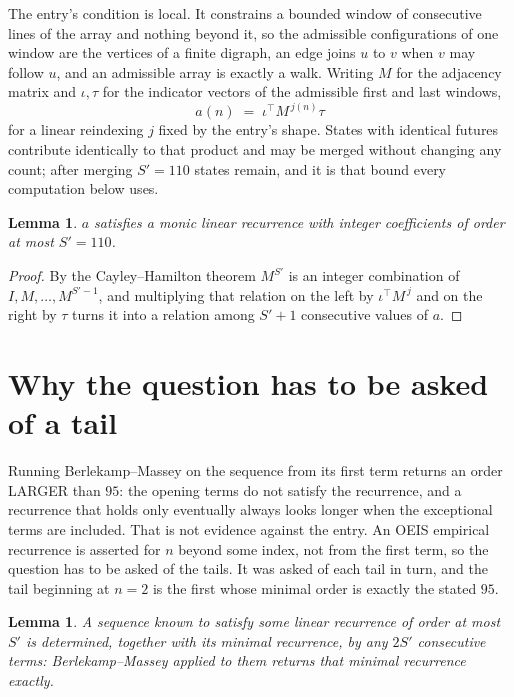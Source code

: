 \documentclass[11pt,a4paper]{article}
\theoremstyle{plain}
\newtheorem{lemma}[theorem]{Lemma}
\theoremstyle{definition}
\begin{document}
The entry's condition is local. It constrains a bounded window of consecutive lines of the
array and nothing beyond it, so the admissible configurations of one window are the vertices of
a finite digraph, an edge joins $u$ to $v$ when $v$ may follow $u$, and an admissible array is
exactly a walk. Writing $M$ for the adjacency matrix and $\iota,\tau$ for the indicator vectors
of the admissible first and last windows,
\[
a(n)\;=\;\iota^{\!\top}M^{\,j(n)}\tau
\]
for a linear reindexing $j$ fixed by the entry's shape. States with identical futures
contribute identically to that product and may be merged without changing any count; after
merging $S'=110$ states remain, and it is that bound every computation below uses.

\begin{lemma}\label{lem:cf}
$a$ satisfies a monic linear recurrence with integer coefficients of order at most $S'=110$.
\end{lemma}

\begin{proof}
By the Cayley--Hamilton theorem $M^{S'}$ is an integer combination of $I,M,\dots,M^{S'-1}$,
and multiplying that relation on the left by $\iota^{\!\top}M^{\,j}$ and on the right by
$\tau$ turns it into a relation among $S'+1$ consecutive values of $a$.
\end{proof}

\section{Why the question has to be asked of a tail}

Running Berlekamp--Massey on the sequence from its first term returns an order LARGER than $95$: the opening terms do not satisfy the recurrence, and a recurrence that holds only eventually always looks longer when the exceptional terms are included. That is not evidence against the entry. An OEIS empirical recurrence is asserted for $n$ beyond some index, not from the first term, so the question has to be asked of the tails. It was asked of each tail in turn, and the tail beginning at $n=2$ is the first whose minimal order is exactly the stated $95$.

\begin{lemma}\label{lem:bm}
A sequence known to satisfy some linear recurrence of order at most $S'$ is determined,
together with its minimal recurrence, by any $2S'$ consecutive terms: Berlekamp--Massey applied
to them returns that minimal recurrence exactly.
\end{lemma}
\end{document}
